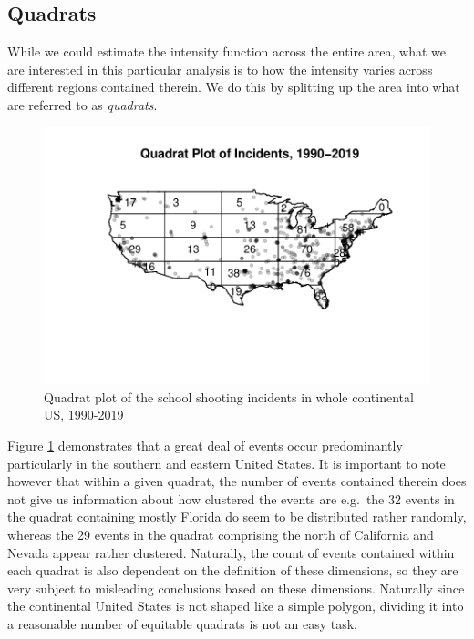 \documentclass[12pt]{article}
\begin{document}
\hypertarget{quadrats}{%
\subsection{Quadrats}\label{quadrats}}

While we could estimate the intensity function across the entire area, what we are interested in this particular analysis is to how the intensity varies across different regions contained therein. We do this by splitting up the area into what are referred to as \emph{quadrats}.

\begin{figure}
\centering
\includegraphics{JStevenRaquel_STATS295_Final_files/figure-latex/plot-quadrats-1990-2019-1.pdf}
\caption{\label{fig:plot-quadrats-1990-2019}Quadrat plot of the school shooting incidents in whole continental US, 1990-2019}
\end{figure}

Figure \ref{fig:plot-quadrats-1990-2019} demonstrates that a great deal of events occur predominantly particularly in the southern and eastern United States. It is important to note however that within a given quadrat, the number of events contained therein does not give us information about how clustered the events are e.g.~the 32 events in the quadrat containing mostly Florida do seem to be distributed rather randomly, whereas the 29 events in the quadrat comprising the north of California and Nevada appear rather clustered. Naturally, the count of events contained within each quadrat is also dependent on the definition of these dimensions, so they are very subject to misleading conclusions based on these dimensions. Naturally since the continental United States is not shaped like a simple polygon, dividing it into a reasonable number of equitable quadrats is not an easy task.
\end{document}
